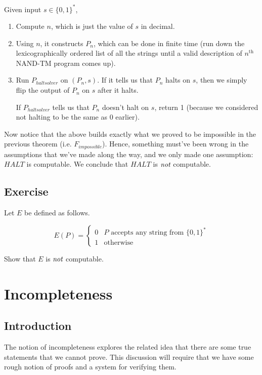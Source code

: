 \documentclass[11pt]{article}
\theoremstyle{definition}
\theoremstyle{remark}
\begin{document}
    Given input $s \in \{0, 1\}^*$, 
    \begin{enumerate}
        \item{
                Compute $n$, which is just the value of $s$ in decimal.
            }
        \item{
                Using $n$, it constructs $P_n$, which can be done in finite time (run down the
                lexicographically ordered list of all the strings until a valid description of $n^\text{th}$ NAND-TM
                program comes up).
            }
        \item{
                Run $P_{haltsolver}$ on $(P_n, s)$. If it tells us that $P_n$ halts on $s$, then we simply flip the output
                of $P_n$ on $s$ after it halts.

                If $P_{haltsolver}$ tells us that $P_n$ doesn't halt on $s$, return 1 (because we considered not halting to be
                the same as 0 earlier).
            }
    \end{enumerate}

    Now notice that the above builds exactly what we proved to be impossible in the previous theorem (i.e. $F_{impossible}$). Hence, something must've been wrong in the
    assumptions that we've made along the way, and we only made one assumption: $HALT$ is computable. We conclude that
    $HALT$ is $\emph{not}$ computable.

    
    \subsection{Exercise}
    Let $E$ be defined as follows.

   \begin{equation*}
       E(P) = \begin{cases}
           0 & \text{$P$ accepts any string from $\{0, 1\}^*$} \\
            1 & \text{otherwise}
        \end{cases}
    \end{equation*}

    Show that $E$ is $\emph{not}$ computable.


\section{Incompleteness}
\subsection{Introduction}
The notion of incompleteness explores the related idea that
there are some true statements that we cannot prove. This discussion
will require that we have some rough notion of proofs and a system
for verifying them.
\end{document}
